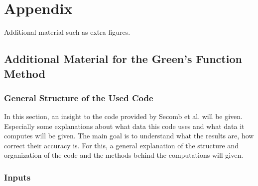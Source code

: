 
\section{Appendix}
\label{s:Appendix}

Additional material such as extra figures.

\subsection{Additional Material for the Green's Function Method}

\subsubsection{General Structure of the Used Code}

In this section, an insight to the code provided by Secomb et al. \cite{Secomb2004} will be given. Especially some explanations about what data this code uses and what data it computes will be given. 
The main goal is to understand what the results are, how correct their accuracy is. For this, a general explanation of the structure and organization of the code and the methods behind the computations will given.

\subsubsection*{Inputs}
\label{Inputs}

